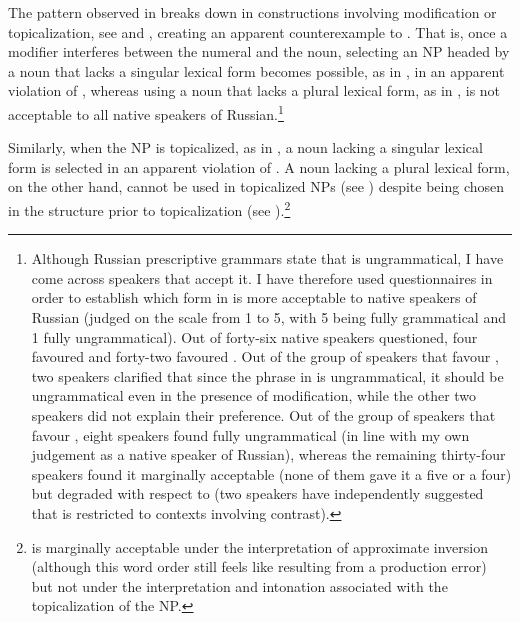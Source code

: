 \documentclass[output=paper,
modfonts,
newtxmath,
hidelinks
]{langscibook}
\begin{document}
The pattern observed in  breaks down in constructions involving modification or topicalization, see  and , creating an apparent counterexample to . That is, once a modifier interferes between the numeral and the noun, selecting an NP headed by a noun that lacks a singular lexical form becomes possible, as in , in an apparent violation of , whereas using a noun that lacks a plural lexical form, as in , is not acceptable to all native speakers of Russian.\footnote{\label{18:fn7}Although Russian prescriptive grammars state that  is ungrammatical, I have come across speakers that accept it. I have therefore used questionnaires in order to establish which form in  is more acceptable to native speakers of Russian (judged on the scale from 1 to 5, with 5 being fully grammatical and 1 fully ungrammatical). Out of forty-six native speakers questioned, four favoured  and forty-two favoured . Out of the group of speakers that favour , two speakers clarified that since the phrase in  is ungrammatical, it should be ungrammatical even in the presence of modification, while the other two speakers did not explain their preference. Out of the group of speakers that favour , eight speakers found  fully ungrammatical (in line with my own judgement as a native speaker of Russian), whereas the remaining thirty-four speakers found it marginally acceptable (none of them gave it a five or a four) but degraded with respect to  (two speakers have independently suggested that  is restricted to contexts involving contrast).} 
\ea \label{18:ex9}
	\z
\z

\noindent Similarly, when the NP is topicalized, as in , a noun lacking a singular lexical form is selected in an apparent violation of . A noun lacking a plural lexical form, on the other hand, cannot be used in topicalized NPs (see ) despite being chosen in the structure prior to topicalization (see ).\footnote{\label{18:fn8} is marginally acceptable under the interpretation of approximate inversion (although this word order still feels like resulting from a production error) but not under the interpretation and intonation associated with the topicalization of the NP.}
\end{document}
